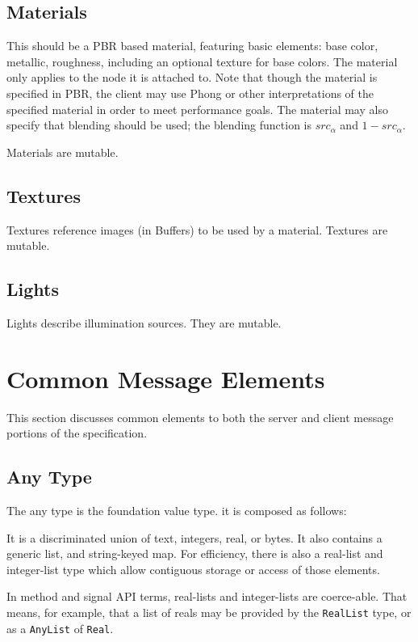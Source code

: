 \documentclass[11pt, oneside]{amsart}
\begin{document}
\subsection{Materials}
This should be a PBR based material, featuring basic elements: base color, metallic, roughness, including an optional texture for base colors. The material only applies to the node it is attached to. Note that though the material is specified in PBR, the client may use Phong or other interpretations of the specified material in order to meet performance goals. The material may also specify that blending should be used; the blending function is $src_{\alpha}$ and $1-src_{\alpha}$.

Materials are mutable.

\subsection{Textures}
Textures reference images (in Buffers) to be used by a material. Textures are mutable.

\subsection{Lights}
Lights describe illumination sources. They are mutable.

\section{Common Message Elements}
This section discusses common elements to both the server and client message portions of the specification.

\subsection{Any Type}
The any type is the foundation value type. it is composed as follows:



It is a discriminated union of text, integers, real, or bytes. It also contains a generic list, and string-keyed map. For efficiency, there is also a real-list and integer-list type which allow contiguous storage or access of those elements.

In method and signal API terms, real-lists and integer-lists are coerce-able. That means, for example, that a list of reals may be provided by the \texttt{RealList} type, or as a \texttt{AnyList} of \texttt{Real}.
\end{document}
